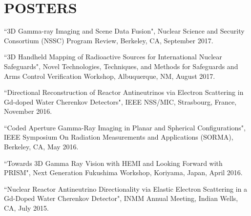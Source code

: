 \section{\small{POSTERS}}

 \begin{thebibliography}{3}
 \raggedright
 \vspace{10pt}

 ``3D Gamma-ray Imaging and Scene Data Fusion", Nuclear Science and Security Consortium (NSSC) Program Review, Berkeley, CA, September 2017.

 ``3D Handheld Mapping of Radioactive Sources for International Nuclear Safeguards", Novel Technologies, Techniques, and Methods for Safeguards and Arms Control Verification Workshop, Albuquerque, NM, August 2017.

 ``Directional Reconstruction of Reactor Antineutrinos via Electron Scattering in Gd-doped Water Cherenkov Detectors", IEEE NSS/MIC, Strasbourg, France, November 2016. 

  ``Coded Aperture Gamma-Ray Imaging in Planar and Spherical Configurations", IEEE Symposium On Radiation Measurements and Applications (SORMA), Berkeley, CA, May 2016.

  ``Towards 3D Gamma Ray Vision with HEMI and Looking Forward with PRISM", Next Generation Fukushima Workshop, Koriyama, Japan, April 2016.
 
  ``Nuclear Reactor Antineutrino Directionality via Elastic Electron Scattering in a Gd-Doped Water Cherenkov Detector", INMM Annual Meeting, Indian Wells, CA, July 2015.
 
 \end{thebibliography}